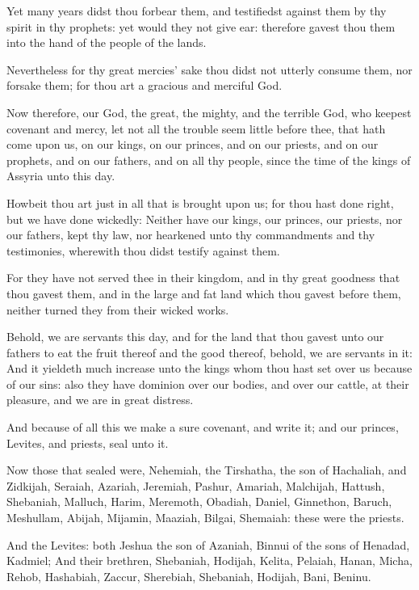 \Verse Yet many years didst thou forbear them, and testifiedst against them by thy spirit in thy prophets: yet would they not give ear: therefore gavest thou them into the hand of the people of the lands.

\Verse Nevertheless for thy great mercies' sake thou didst not utterly consume them, nor forsake them; for thou art a gracious and merciful God.

\Verse Now therefore, our God, the great, the mighty, and the terrible God, who keepest covenant and mercy, let not all the trouble seem little before thee, that hath come upon us, on our kings, on our princes, and on our priests, and on our prophets, and on our fathers, and on all thy people, since the time of the kings of Assyria unto this day.

\Verse Howbeit thou art just in all that is brought upon us; for thou hast done right, but we have done wickedly: \Verse Neither have our kings, our princes, our priests, nor our fathers, kept thy law, nor hearkened unto thy commandments and thy testimonies, wherewith thou didst testify against them.

\Verse For they have not served thee in their kingdom, and in thy great goodness that thou gavest them, and in the large and fat land which thou gavest before them, neither turned they from their wicked works.

\Verse Behold, we are servants this day, and for the land that thou gavest unto our fathers to eat the fruit thereof and the good thereof, behold, we are servants in it: \Verse And it yieldeth much increase unto the kings whom thou hast set over us because of our sins: also they have dominion over our bodies, and over our cattle, at their pleasure, and we are in great distress.

\Verse And because of all this we make a sure covenant, and write it; and our princes, Levites, and priests, seal unto it.


\Chapter
\Verse Now those that sealed were, Nehemiah, the Tirshatha, the son of Hachaliah, and Zidkijah, \Verse Seraiah, Azariah, Jeremiah, \Verse Pashur, Amariah, Malchijah, \Verse Hattush, Shebaniah, Malluch, \Verse Harim, Meremoth, Obadiah, \Verse Daniel, Ginnethon, Baruch, \Verse Meshullam, Abijah, Mijamin, \Verse Maaziah, Bilgai, Shemaiah: these were the priests.

\Verse And the Levites: both Jeshua the son of Azaniah, Binnui of the sons of Henadad, Kadmiel; \Verse And their brethren, Shebaniah, Hodijah, Kelita, Pelaiah, Hanan, \Verse Micha, Rehob, Hashabiah, \Verse Zaccur, Sherebiah, Shebaniah, \Verse Hodijah, Bani, Beninu.

